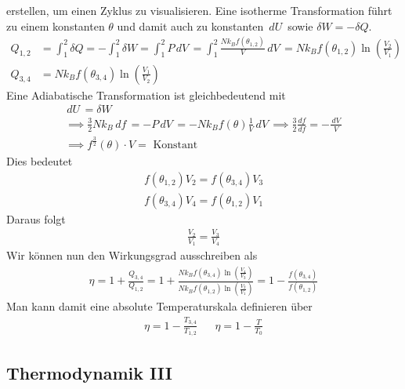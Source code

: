 \documentclass[11pt]{article}
\theoremstyle{plain}
\theoremstyle{mytheoremstyle}
\newcommand{\dd}[2]{\frac{d{#1}}{d{#2}}}
\renewcommand{\d}[1]{\,d#1\,}
\begin{document}
\begin{description}
    erstellen, um einen Zyklus zu visualisieren. Eine isotherme Transformation
    f\"uhrt zu einem konstanten $\theta$ und damit auch zu konstanten
    $ \d{U} $ sowie $\delta W = -\delta Q$.
    \begin{align*}
      Q_{1,2} & = \int_{1}^{2} \delta Q =  - \int_{1}^{2} \delta W = 
      \int_{1}^{2} P \d{V} = \int_{1}^{2} \frac{N k_B f (\theta_{1,2})}{V}
      \d{ V} = N k_B f(\theta_{1,2}) \ln{\left( \frac{V_2}{V_1} \right)} \\
      Q_{3,4} & = N k_B f(\theta_{3,4}) \ln{\left( \frac{V_1}{V_2} \right)}
    \end{align*}
    Eine Adiabatische Transformation ist gleichbedeutend mit
    \begin{align*}
      \d{U} = \delta W \\
      \implies \frac{3}{2 } N k_B \d{f} = - P \d{V} = - N k_B f(\theta) 
      \frac{1}{V} \d{V}
      \implies \frac{3}{2} \dd{f}{f} = - \frac{\d{V}}{V} \\
      \implies f^{\frac{3}{2}}(\theta) \cdot V = \text{ Konstant }
    \end{align*}
    Dies bedeutet
    \begin{align*}
      f(\theta_{1,2}) V_2 = f(\theta_{3,4}) V_3 \\
      f(\theta_{3,4}) V_4 = f(\theta_{1,2}) V_1 
    \end{align*}
    Daraus folgt
    \begin{align*}
      \frac{V_2}{V_1} = \frac{V_3}{V_4}
    \end{align*}
    Wir k\"onnen nun den Wirkungsgrad ausschreiben als
    \begin{align*}
      \eta = 1 + \frac{Q_{3,4}}{Q_{1,2}} = 1 + \frac{N k_B f(\theta_{3,4}) \ln{\left( \frac{V_4}{V_3} \right)}}{
      N k_B f(\theta_{1,2}) \ln{\left( \frac{V_2}{V_1} \right)}} 
      = 1 - \frac{f(\theta_{3,4})}{f(\theta_{1,2})} 
    \end{align*}
    Man kann damit eine absolute Temperaturskala definieren über 
    \begin{align*}
      \eta = 1 - \frac{T_{3,4}}{T_{1,2}} && \eta = 1 - \frac{T}{T_0}
    \end{align*}
\end{description}

\subsection*{Thermodynamik III}
\end{document}
